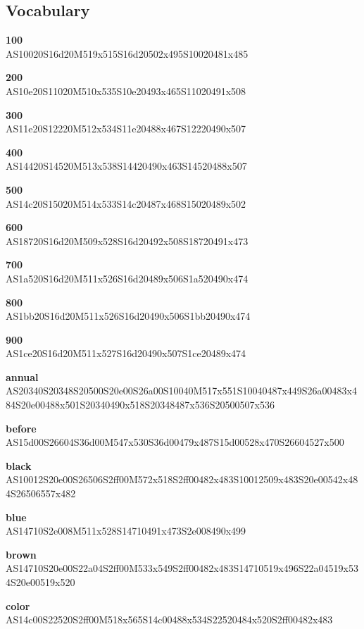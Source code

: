 \documentclass{article}
\begin{document}
\subsection{Vocabulary}

\begin{glossary}

\textbf{100}\\
AS10020S16d20M519x515S16d20502x495S10020481x485

\textbf{200}\\
AS10e20S11020M510x535S10e20493x465S11020491x508

\textbf{300}\\
AS11e20S12220M512x534S11e20488x467S12220490x507

\textbf{400}\\
AS14420S14520M513x538S14420490x463S14520488x507

\textbf{500}\\
AS14c20S15020M514x533S14c20487x468S15020489x502

\textbf{600}\\
AS18720S16d20M509x528S16d20492x508S18720491x473

\textbf{700}\\
AS1a520S16d20M511x526S16d20489x506S1a520490x474

\textbf{800}\\
AS1bb20S16d20M511x526S16d20490x506S1bb20490x474

\textbf{900}\\
AS1ce20S16d20M511x527S16d20490x507S1ce20489x474

\textbf{annual}\\
AS20340S20348S20500S20e00S26a00S10040M517x551S10040487x449S26a00483x484S20e00488x501S20340490x518S20348487x536S20500507x536

\textbf{before}\\
AS15d00S26604S36d00M547x530S36d00479x487S15d00528x470S26604527x500

\textbf{black}\\
AS10012S20e00S26506S2ff00M572x518S2ff00482x483S10012509x483S20e00542x484S26506557x482

\textbf{blue}\\
AS14710S2e008M511x528S14710491x473S2e008490x499

\textbf{brown}\\
AS14710S20e00S22a04S2ff00M533x549S2ff00482x483S14710519x496S22a04519x534S20e00519x520

\textbf{color}\\
AS14c00S22520S2ff00M518x565S14c00488x534S22520484x520S2ff00482x483


\end{glossary}
\end{document}

